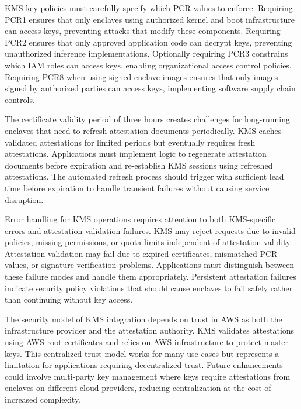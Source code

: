 KMS key policies must carefully specify which PCR values to enforce. Requiring PCR1 ensures that only enclaves using authorized kernel and boot infrastructure can access keys, preventing attacks that modify these components. Requiring PCR2 ensures that only approved application code can decrypt keys, preventing unauthorized inference implementations. Optionally requiring PCR3 constrains which IAM roles can access keys, enabling organizational access control policies. Requiring PCR8 when using signed enclave images ensures that only images signed by authorized parties can access keys, implementing software supply chain controls.

The certificate validity period of three hours creates challenges for long-running enclaves that need to refresh attestation documents periodically. KMS caches validated attestations for limited periods but eventually requires fresh attestations. Applications must implement logic to regenerate attestation documents before expiration and re-establish KMS sessions using refreshed attestations. The automated refresh process should trigger with sufficient lead time before expiration to handle transient failures without causing service disruption.

Error handling for KMS operations requires attention to both KMS-specific errors and attestation validation failures. KMS may reject requests due to invalid policies, missing permissions, or quota limits independent of attestation validity. Attestation validation may fail due to expired certificates, mismatched PCR values, or signature verification problems. Applications must distinguish between these failure modes and handle them appropriately. Persistent attestation failures indicate security policy violations that should cause enclaves to fail safely rather than continuing without key access.

The security model of KMS integration depends on trust in AWS as both the infrastructure provider and the attestation authority. KMS validates attestations using AWS root certificates and relies on AWS infrastructure to protect master keys. This centralized trust model works for many use cases but represents a limitation for applications requiring decentralized trust. Future enhancements could involve multi-party key management where keys require attestations from enclaves on different cloud providers, reducing centralization at the cost of increased complexity.